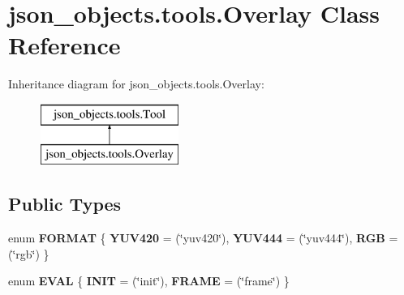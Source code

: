 \hypertarget{classjson__objects_1_1tools_1_1_overlay}{
\section{json\_\-objects.tools.Overlay Class Reference}
\label{classjson__objects_1_1tools_1_1_overlay}
}
Inheritance diagram for json\_\-objects.tools.Overlay:\begin{figure}[H]
\begin{center}
\leavevmode
\includegraphics[height=2.000000cm]{classjson__objects_1_1tools_1_1_overlay}
\end{center}
\end{figure}
\subsection*{Public Types}
\begin{DoxyCompactItemize}
\item 
enum {\bfseries FORMAT} \{ {\bfseries YUV420} = (\char`\"{}yuv420\char`\"{}), 
{\bfseries YUV444} = (\char`\"{}yuv444\char`\"{}), 
{\bfseries RGB} = (\char`\"{}rgb\char`\"{})
 \}
\item 
enum {\bfseries EVAL} \{ {\bfseries INIT} = (\char`\"{}init\char`\"{}), 
{\bfseries FRAME} = (\char`\"{}frame\char`\"{})
 \}
\end{DoxyCompactItemize}

